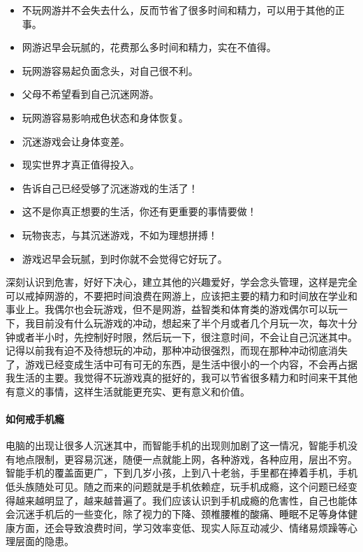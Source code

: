 \begin{multicols}{2}
    \begin{itemize}
        \item 不玩网游并不会失去什么，反而节省了很多时间和精力，可以用于其他的正事。
        \item 网游迟早会玩腻的，花费那么多时间和精力，实在不值得。
        \item 玩网游容易起负面念头，对自己很不利。
        \item 父母不希望看到自己沉迷网游。
        \item 玩网游容易影响戒色状态和身体恢复。
        \item 沉迷游戏会让身体变差。
        \item 现实世界才真正值得投入。
        \item 告诉自己已经受够了沉迷游戏的生活了！
        \item 这不是你真正想要的生活，你还有更重要的事情要做！
        \item 玩物丧志，与其沉迷游戏，不如为理想拼搏！
        \item 游戏迟早会玩腻，到时你就不会觉得它好玩了。
    \end{itemize}
\end{multicols}

深刻认识到危害，好好下决心，建立其他的兴趣爱好，学会念头管理，这样是完全可以戒掉网游的，不要把时间浪费在网游上，应该把主要的精力和时间放在学业和事业上。我偶尔也会玩游戏，但不是网游，益智类和体育类的游戏偶尔可以玩一下，我目前没有什么玩游戏的冲动，想起来了半个月或者几个月玩一次，每次十分钟或者半小时，先控制好时限，然后玩一下，很注意时间，不会让自己沉迷其中。记得以前我有迫不及待想玩的冲动，那种冲动很强烈，而现在那种冲动彻底消失了，游戏已经变成生活中可有可无的东西，是生活中很小的一个内容，不会再占据我生活的主要。我觉得不玩游戏真的挺好的，我可以节省很多精力和时间来干其他有意义的事情，这样生活就能更充实、更有意义和价值。

\paragraph{如何戒手机瘾}

电脑的出现让很多人沉迷其中，而智能手机的出现则加剧了这一情况，智能手机没有地点限制，更容易沉迷，随便一点就能上网，各种游戏，各种应用，层出不穷。智能手机的覆盖面更广，下到几岁小孩，上到八十老翁，手里都在捧着手机，手机低头族随处可见。随之而来的问题就是手机依赖症，玩手机成瘾，这个问题已经变得越来越明显了，越来越普遍了。我们应该认识到手机成瘾的危害性，自己也能体会沉迷手机后的一些变化，除了视力的下降、颈椎腰椎的酸痛、睡眠不足等身体健康方面，还会导致浪费时间，学习效率变低、现实人际互动减少、情绪易烦躁等心理层面的隐患。

